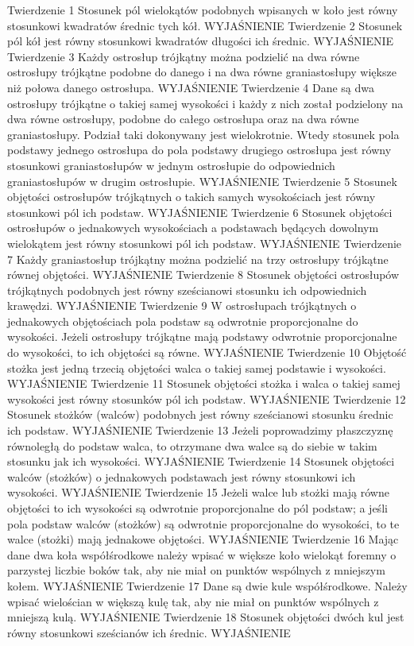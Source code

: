 Twierdzenie 1
    Stosunek pól wielokątów podobnych wpisanych w koło jest równy stosunkowi kwadratów średnic tych kół.
    WYJAŚNIENIE
Twierdzenie 2
    Stosunek pól kół jest równy stosunkowi kwadratów długości ich średnic.
    WYJAŚNIENIE
Twierdzenie 3
    Każdy ostrosłup trójkątny można podzielić na dwa równe ostrosłupy trójkątne podobne do danego i na dwa równe graniastosłupy większe niż połowa danego ostrosłupa.
    WYJAŚNIENIE
Twierdzenie 4
    Dane są dwa ostrosłupy trójkątne o takiej samej wysokości i każdy z nich został podzielony na dwa równe ostrosłupy, podobne do całego ostrosłupa oraz na dwa równe graniastosłupy. Podział taki dokonywany jest wielokrotnie. Wtedy stosunek pola podstawy jednego ostrosłupa do pola podstawy drugiego ostrosłupa jest równy stosunkowi graniastosłupów w jednym ostrosłupie do odpowiednich graniastosłupów w drugim ostrosłupie.
    WYJAŚNIENIE
Twierdzenie 5
    Stosunek objętości ostrosłupów trójkątnych o takich samych wysokościach jest równy stosunkowi pól ich podstaw.
    WYJAŚNIENIE
Twierdzenie 6
    Stosunek objętości ostrosłupów o jednakowych wysokościach a podstawach będących dowolnym wielokątem jest równy stosunkowi pól ich podstaw.
    WYJAŚNIENIE
Twierdzenie 7
    Każdy graniastosłup trójkątny można podzielić na trzy ostrosłupy trójkątne równej objętości.
    WYJAŚNIENIE
Twierdzenie 8
    Stosunek objętości ostrosłupów trójkątnych podobnych jest równy sześcianowi stosunku ich odpowiednich krawędzi.
    WYJAŚNIENIE
Twierdzenie 9
    W ostrosłupach trójkątnych o jednakowych objętościach pola podstaw są odwrotnie proporcjonalne do wysokości. Jeżeli ostrosłupy trójkątne mają podstawy odwrotnie proporcjonalne do wysokości, to ich objętości są równe.
    WYJAŚNIENIE
Twierdzenie 10
    Objętość stożka jest jedną trzecią objętości walca o takiej samej podstawie i wysokości.
    WYJAŚNIENIE
Twierdzenie 11
    Stosunek objętości stożka i walca o takiej samej wysokości jest równy stosunków pól ich podstaw.
    WYJAŚNIENIE
Twierdzenie 12
    Stosunek stożków (walców) podobnych jest równy sześcianowi stosunku średnic ich podstaw.
    WYJAŚNIENIE
Twierdzenie 13
    Jeżeli poprowadzimy płaszczyznę równoległą do podstaw walca, to otrzymane dwa walce są do siebie w takim stosunku jak ich wysokości.
    WYJAŚNIENIE
Twierdzenie 14
    Stosunek objętości walców (stożków) o jednakowych podstawach jest równy stosunkowi ich wysokości.
    WYJAŚNIENIE
Twierdzenie 15
    Jeżeli walce lub stożki mają równe objętości to ich wysokości są odwrotnie proporcjonalne do pól podstaw; a jeśli pola podstaw walców (stożków) są odwrotnie proporcjonalne do wysokości, to te walce (stożki) mają jednakowe objętości.
    WYJAŚNIENIE
Twierdzenie 16
    Mając dane dwa koła współśrodkowe należy wpisać w większe koło wielokąt foremny o parzystej liczbie boków tak, aby nie miał on punktów wspólnych z mniejszym kołem.
    WYJAŚNIENIE
Twierdzenie 17
    Dane są dwie kule współśrodkowe. Należy wpisać wielościan w większą kulę tak, aby nie miał on punktów wspólnych z mniejszą kulą.
    WYJAŚNIENIE
Twierdzenie 18
    Stosunek objętości dwóch kul jest równy stosunkowi sześcianów ich średnic.
    WYJAŚNIENIE



